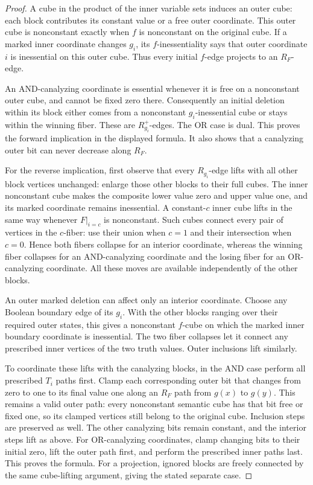 \begin{proof}
A cube in the product of the inner variable sets induces an outer cube:
each block contributes its constant value or a free outer coordinate.
This outer cube is nonconstant exactly when $f$ is nonconstant on the
original cube. If a marked inner coordinate changes $g_i$, its
$f$-inessentiality says that outer coordinate $i$ is inessential on this
outer cube. Thus every initial $f$-edge projects to an $R_F$-edge.

An AND-canalyzing coordinate is essential whenever it is free on a
nonconstant outer cube, and cannot be fixed zero there. Consequently
an initial deletion within its block either comes from a nonconstant
$g_i$-inessential cube or stays within the winning fiber. These are
$R_{g_i}^+$-edges. The OR case is dual. This proves the forward implication
in the displayed formula. It also shows that a canalyzing outer bit can
never decrease along $R_F$.

For the reverse implication, first observe that every $R_{g_i}$-edge
lifts with all other block vertices unchanged: enlarge those other
blocks to their full cubes. The inner nonconstant cube makes the
composite lower value zero and upper value one, and its marked coordinate
remains inessential. A constant-$c$ inner cube lifts in the same way
whenever $F|_{i=c}$ is nonconstant. Such cubes connect every pair of
vertices in the $c$-fiber: use their union when $c=1$ and their intersection
when $c=0$. Hence both fibers collapse for an interior coordinate,
whereas the winning fiber collapses for an AND-canalyzing coordinate
and the losing fiber for an OR-canalyzing coordinate. All these moves
are available independently of the other blocks.

An outer marked deletion can affect only an interior coordinate.
Choose any Boolean boundary edge of its $g_i$. With the other blocks
ranging over their required outer states, this gives a nonconstant
$f$-cube on which the marked inner boundary coordinate is inessential.
The two fiber collapses let it connect any prescribed inner vertices
of the two truth values. Outer inclusions lift similarly.

To coordinate these lifts with the canalyzing blocks, in the AND case
perform all prescribed $T_i$ paths first. Clamp each corresponding
outer bit that changes from zero to one to its final value one along
an $R_F$ path from $g(x)$ to $g(y)$. This remains a valid outer path:
every nonconstant semantic cube has that bit free or fixed one, so
its clamped vertices still belong to the original cube. Inclusion
steps are preserved as well. The other canalyzing bits remain constant,
and the interior steps lift as above. For OR-canalyzing coordinates,
clamp changing bits to their initial zero, lift the outer path first,
and perform the prescribed inner paths last. This proves the formula.
For a projection, ignored blocks are freely connected by the same
cube-lifting argument, giving the stated separate case.


\end{proof}
